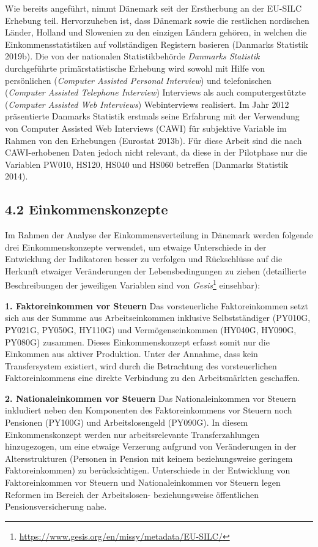 \documentclass[12pt,]{article}
\let\rmarkdownfootnote\footnote%
\def\footnote{\protect\rmarkdownfootnote}
\begin{document}
Wie bereits angeführt, nimmt Dänemark seit der Erstherbung an der
EU-SILC Erhebung teil. Hervorzuheben ist, dass Dänemark sowie die
restlichen nordischen Länder, Holland und Slowenien zu den einzigen
Ländern gehören, in welchen die Einkommensstatistiken auf vollständigen
Registern basieren (Danmarks Statistik 2019b). Die von der nationalen
Statistikbehörde \emph{Danmarks Statistik} durchgeführte
primärstatistische Erhebung wird sowohl mit Hilfe von persönlichen
(\emph{Computer Assisted Personal Interview}) und telefonischen
(\emph{Computer Assisted Telephone Interview}) Interviews als auch
computergestützte (\emph{Computer Assisted Web Interviews})
Webinterviews realisiert. Im Jahr 2012 präsentierte Danmarks Statistik
erstmals seine Erfahrung mit der Verwendung von Computer Assisted Web
Interviews (CAWI) für subjektive Variable im Rahmen von den Erhebungen
(Eurostat 2013b). Für diese Arbeit sind die nach CAWI-erhobenen Daten
jedoch nicht relevant, da diese in der Pilotphase nur die Variablen
PW010, HS120, HS040 und HS060 betreffen (Danmarks Statistik 2014).

\subsection{4.2 Einkommenskonzepte}\label{einkommenskonzepte}

Im Rahmen der Analyse der Einkommensverteilung in Dänemark werden
folgende drei Einkommenskonzepte verwendet, um etwaige Unterschiede in
der Entwicklung der Indikatoren besser zu verfolgen und Rückschlüsse auf
die Herkunft etwaiger Veränderungen der Lebensbedingungen zu ziehen
(detaillierte Beschreibungen der jeweiligen Variablen sind von
\emph{Gesis}\footnote{\url{https://www.gesis.org/en/missy/metadata/EU-SILC/}}
einsehbar):

\textbf{1. Faktoreinkommen vor Steuern} Das vorsteuerliche
Faktoreinkommen setzt sich aus der Summme aus Arbeitseinkommen inklusive
Selbstständiger (PY010G, PY021G, PY050G, HY110G) und Vermögenseinkommen
(HY040G, HY090G, PY080G) zusammen. Dieses Einkommenskonzept erfasst
somit nur die Einkommen aus aktiver Produktion. Unter der Annahme, dass
kein Transfersystem existiert, wird durch die Betrachtung des
vorsteuerlichen Faktoreinkommens eine direkte Verbindung zu den
Arbeitsmärkten geschaffen.

\textbf{2. Nationaleinkommen vor Steuern} Das Nationaleinkommen vor
Steuern inkludiert neben den Komponenten des Faktoreinkommens vor
Steuern noch Pensionen (PY100G) und Arbeitslosengeld (PY090G). In diesem
Einkommenskonzept werden nur arbeitsrelevante Transferzahlungen
hinzugezogen, um eine etwaige Verzerung aufgrund von Veränderungen in
der Altersstrukturen (Personen in Pension mit keinem beziehungsweise
geringem Faktoreinkommen) zu berücksichtigen. Unterschiede in der
Entwicklung von Faktoreinkommen vor Steuern und Nationaleinkommen vor
Steuern legen Reformen im Bereich der Arbeitslosen- beziehungsweise
öffentlichen Pensionsversicherung nahe.
\end{document}
